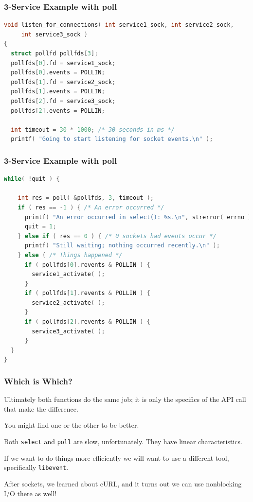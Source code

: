 \begin{frame}[fragile]
	\frametitle{3-Service Example with poll}
	\begin{lstlisting}[language=C]
void listen_for_connections( int service1_sock, int service2_sock,
     int service3_sock ) 
{
  struct pollfd pollfds[3];
  pollfds[0].fd = service1_sock;
  pollfds[0].events = POLLIN;
  pollfds[1].fd = service2_sock;
  pollfds[1].events = POLLIN;
  pollfds[2].fd = service3_sock;
  pollfds[2].events = POLLIN;
 
  int timeout = 30 * 1000; /* 30 seconds in ms */ 
  printf( "Going to start listening for socket events.\n" );
\end{lstlisting}

\end{frame}

\begin{frame}[fragile]
	\frametitle{3-Service Example with poll}
	\begin{lstlisting}[language=C]
  while( !quit ) {
    
    int res = poll( &pollfds, 3, timeout );
    if ( res == -1 ) { /* An error occurred */
      printf( "An error occurred in select(): %s.\n", strerror( errno ) );
      quit = 1;
    } else if ( res == 0 ) { /* 0 sockets had events occur */
      printf( "Still waiting; nothing occurred recently.\n" );
    } else { /* Things happened */
      if ( pollfds[0].revents & POLLIN ) {
        service1_activate( ); 
      }
      if ( pollfds[1].revents & POLLIN ) {
        service2_activate( ); 
      }
      if ( pollfds[2].revents & POLLIN ) {
        service3_activate( ); 
      }
  }
}
\end{lstlisting}

\end{frame}


\begin{frame}
	\frametitle{Which is Which?}

	Ultimately both functions do the same job; it is only the specifics of the API call that make the difference.

	You might find one or the other to be better.

	Both \texttt{select} and \texttt{poll} are slow, unfortunately. They have linear characteristics.

	If we want to do things more efficiently we will want to use a different tool, specifically \texttt{libevent}.

	After sockets, we learned about cURL, and it turns out we can use nonblocking I/O there as well!

\end{frame}





